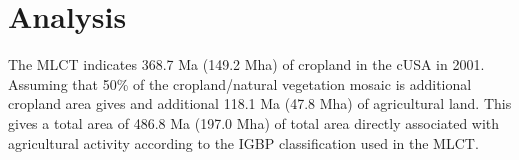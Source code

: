
\chapter{Analysis} %



\ifpdf
    \graphicspath{{X/figures/PNG/}{X/figures/PDF/}{X/figures/}}
\else
    \graphicspath{{X/figures/EPS/}{X/figures/}}
\fi



The MLCT indicates 368.7 Ma (149.2 Mha) of cropland in the cUSA in 2001.  Assuming that 50\% of the cropland/natural vegetation mosaic is additional cropland area gives and additional 118.1 Ma (47.8 Mha) of agricultural land.  This gives a total area of  486.8 Ma (197.0 Mha) of total area directly associated with agricultural activity according to the IGBP classification used in the MLCT.







